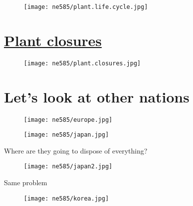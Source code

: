 \documentclass[aspectratio=1610,pdftex,dvipsnames,compress,xcolor={dvipsnames}]{beamer}
\begin{document}
\addtocounter{framenumber}{-1} 
\begin{frame}{}
    \begin{figure}
        \centering
        \texttt{[image: ne585/plant.life.cycle.jpg]}
    \end{figure}
\end{frame}


\section{\href{https://uidaho.pressbooks.pub/nuclearengineering/chapter/fuel-cycle-overview/}{Plant closures}}


\addtocounter{framenumber}{-1} 
\begin{frame}{}
    \begin{figure}
        \centering
        \texttt{[image: ne585/plant.closures.jpg]}
    \end{figure}
\end{frame}


\section{Let's look at other nations}


\addtocounter{framenumber}{-1} 
\begin{frame}{}
    \begin{figure}
        \centering
        \texttt{[image: ne585/europe.jpg]}
    \end{figure}
\end{frame}


\begin{frame}{}
    \begin{figure}
        \centering
        \texttt{[image: ne585/japan.jpg]}
    \end{figure}
\end{frame}


\begin{frame}{Where are they going to dispose of everything?}
    \begin{figure}
        \centering
        \texttt{[image: ne585/japan2.jpg]}
    \end{figure}
\end{frame}


\begin{frame}{Same problem}
    \begin{figure}
        \centering
        \texttt{[image: ne585/korea.jpg]}
    \end{figure}
\end{frame}
\end{document}
